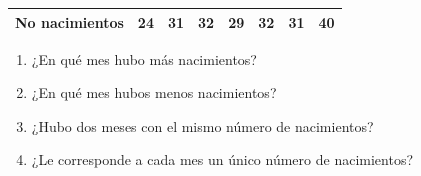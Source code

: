 \documentclass[letterpaper,11pt,twoside]{article}
\begin{document}
\begin{enumerate}
\begin{center}
\begin{tabular}{|c|c|c|c|c|c|c|c|}
\hline 
No nacimientos & 24 & 31 & 32 & 29 & 32 & 31 & 40 \\ 
\hline 
\end{tabular} 
\end{center}
\begin{enumerate}
\item ¿En qué mes hubo más nacimientos?
\item ¿En qué mes hubos menos nacimientos?
\item ¿Hubo dos meses con el mismo número de nacimientos?
\item ¿Le corresponde a cada mes un único número de nacimientos?
\end{enumerate}
\end{enumerate}
\end{document}
